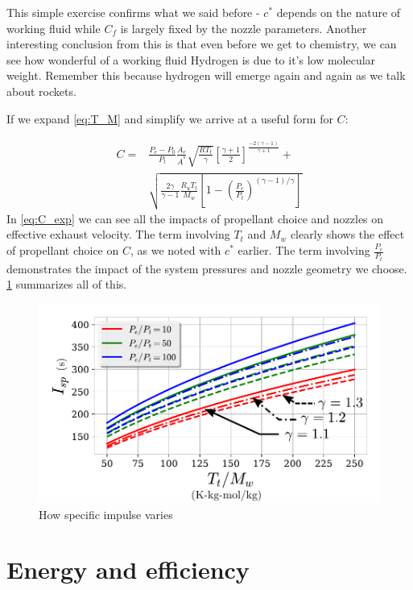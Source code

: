 \documentclass[twocolumn]{memoir} %
\begin{document}
This simple exercise confirms what we said before - $c^*$ depends on the nature of working fluid while $C_f$ is largely fixed by the nozzle parameters.  Another interesting conclusion from this is that even before we get to chemistry, we can
see how wonderful of a working fluid Hydrogen is due to it's low
molecular weight. Remember this because hydrogen will emerge again and
again as we talk about rockets.

If we expand \cref{eq:T_M} and simplify we arrive at a useful form for $C$:

\begin{equation}
    \begin{split}
        C = &\frac{P_e - P_0}{P_t}\frac{A_e}{A^*} 
        \sqrt{\frac{R T_t}{\gamma}}\left[\frac{\gamma + 1}{2}\right]^\frac{-2(\gamma-1)}{\gamma+1} +\\
        & \sqrt{\frac{2 \gamma}{\gamma-1}\frac{R_u T_t}{M_w}\left[1 - \left(\frac{P_e}{P_t}\right)^{(\gamma - 1)/\gamma}\right]}
        \label{eq:C_exp}
    \end{split}
\end{equation}
%
In \cref{eq:C_exp} we can see all the impacts of propellant choice and 
nozzles on effective exhaust velocity.  The term involving $T_t$ and $M_w$ clearly
shows the effect of propellant choice on $C$, as we noted with $c^*$ earlier.
The term involving $\frac{P_e}{P_t}$ demonstrates the impact of the system pressures
and nozzle geometry we choose.  \cref{fig:C} summarizes all of this.

\begin{figure}[h]
    \includegraphics[width=\columnwidth]{C_exp}
    \caption{How specific impulse varies}
    \label{fig:C}
\end{figure}

\section{Energy and efficiency}\label{energy-thermodynamics-and-efficiency}
\end{document}
